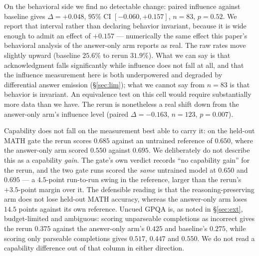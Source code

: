 \documentclass{article}
\begin{document}
On the behavioral side we find no detectable change: paired influence against
baseline gives $\Delta = +0.048$, $95\%$ CI $[-0.060, +0.157]$, $n = 83$,
$p = 0.52$. We report that interval rather than declaring behavior invariant,
because it is wide enough to admit an effect of $+0.157$ --- numerically the
same effect this paper's behavioral analysis of the answer-only arm reports as
real. The raw rates move slightly upward (baseline $25.6\%$ to rerun
$31.9\%$). What we can say is that acknowledgment falls significantly while
influence does not fall at all, and that the influence measurement here is both
underpowered and degraded by differential answer emission (\S\ref{sec:lim});
what we cannot say from $n = 83$ is that behavior is invariant. An equivalence
test on this cell would require substantially more data than we have. The rerun
is nonetheless a real shift down from the answer-only arm's influence level
(paired $\Delta = -0.163$, $n = 123$, $p = 0.007$).

Capability does not fall on the measurement best able to carry it: on the
held-out MATH gate the rerun scores $0.685$ against an untrained reference of
$0.650$, where the answer-only arm scored $0.550$ against $0.695$. We
deliberately do not describe this as a capability \emph{gain}. The gate's own
verdict records ``no capability gain'' for the rerun, and the two gate runs
scored the \emph{same} untrained model at $0.650$ and $0.695$ --- a
$4.5$-point run-to-run swing in the reference, larger than the rerun's
$+3.5$-point margin over it. The defensible reading is that the
reasoning-preserving arm does not lose held-out MATH accuracy, whereas the
answer-only arm loses $14.5$ points against its own reference. Uncued GPQA is,
as noted in \S\ref{sec:ext}, budget-limited and ambiguous: scoring unparseable
completions as incorrect gives the rerun $0.375$ against the answer-only arm's
$0.425$ and baseline's $0.275$, while scoring only parseable completions gives
$0.517$, $0.447$ and $0.550$. We do not read a capability difference out of
that column in either direction.
\end{document}
